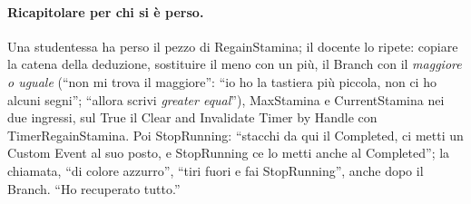 \paragraph{Ricapitolare per chi si è perso.} Una studentessa ha perso il pezzo di
RegainStamina; il docente lo ripete: copiare la catena della deduzione, sostituire il meno
con un più, il Branch con il \emph{maggiore o uguale} (``non mi trova il maggiore'': ``io
ho la tastiera più piccola, non ci ho alcuni segni''; ``allora scrivi \emph{greater
equal}''), MaxStamina e CurrentStamina nei due ingressi, sul True il Clear and Invalidate
Timer by Handle con TimerRegainStamina. Poi StopRunning: ``stacchi da qui il Completed, ci
metti un Custom Event al suo posto, e StopRunning ce lo metti anche al Completed''; la
chiamata, ``di colore azzurro'', ``tiri fuori e fai StopRunning'', anche dopo il Branch.
``Ho recuperato tutto.''

